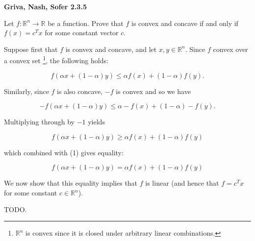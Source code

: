 \textbf{Griva, Nash, Sofer 2.3.5}

Let $f:\mathbb{R}^n \to \mathbb{R}$ be a function. Prove that $f$ is convex and concave if
and only if $f(x) = c^T x$ for some constant vector $c$.

\begin{solution}
  Suppose first that $f$ is convex and concave, and let $x, y \in \mathbb{R}^n$. 
  Since $f$ convex over a convex set \footnote{
    $\mathbb{R}^n$ is convex since it is closed under arbitrary linear combinations.
  }, the following holds:

  \begin{equation}
    f(\alpha x + (1 - \alpha)y) \le \alpha f(x) + (1 - \alpha) f(y).
  \end{equation}

  Similarly, since $f$ is also concave, $-f$ is convex and so we have

  $$
    -f(\alpha x + (1 - \alpha)y) \le \alpha -f(x) + (1 - \alpha) -f(y).
  $$

  Multiplying through by $-1$ yields

  $$
    f(\alpha x + (1 - \alpha)y) \ge \alpha f(x) + (1 - \alpha) f(y)
  $$

  which combined with (1) gives equality:
  
  $$
    f(\alpha x + (1 - \alpha)y) = \alpha f(x) + (1 - \alpha) f(y)
  $$

  We now show that this equality implies that $f$ is linear (and hence that $f = c^T x$ for some
  constant $c \in \mathbb{R}^n$).

  TODO.
  \ \\
\end{solution}